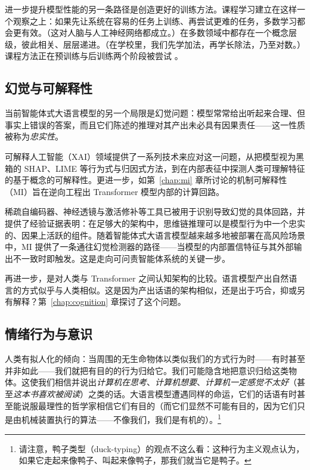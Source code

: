 进一步提升模型性能的另一条路径是创造更好的训练方法。课程学习建立在这样一个观察之上：如果先让系统在容易的任务上训练、再尝试更难的任务，多数学习都会更有效。（这对人脑与人工神经网络都成立。）在多数领域中都存在一个概念层级，彼此相关、层层递进。（在学校里，我们先学加法，再学长除法，乃至对数。）课程方法正在预训练与后训练两个阶段被尝试 \citep{chen2025self,elgaar2026curriculum}。
\subsection{幻觉与可解释性}
当前智能体式大语言模型的另一个局限是幻觉问题：模型常常给出听起来合理、但事实上错误的答案，而且它们陈述的推理对其产出未必具有因果责任——这一性质被称为\emph{忠实性}。

可解释人工智能（XAI）领域提供了一系列技术来应对这一问题，从把模型视为黑箱的 SHAP、LIME 等行为式与归因式方法，到在内部表征中探测人类可理解特征的基于概念的可解释性。更进一步，如第~\ref{chap:mi} 章所讨论的机制可解释性（MI）旨在逆向工程出 Transformer 模型内部的计算回路。

稀疏自编码器、神经透镜与激活修补等工具已被用于识别导致幻觉的具体回路，并提供了经验证据表明：在足够大的架构中，思维链推理可以是模型行为中一个忠实的、因果上活跃的组件。随着智能体式大语言模型越来越多地被部署在高风险场景中，MI 提供了一条通往幻觉检测器的路径——当模型的内部置信特征与其外部输出不一致时即触发。这是走向可问责智能体系统的关键一步。

再进一步，是对人类与 Transformer 之间认知架构的比较。语言模型产出自然语言的方式似乎与人类相似。这是因为产出话语的架构相似，还是出于巧合，抑或另有解释？第~\ref{chap:cognition} 章探讨了这个问题。

\subsection{情绪行为与意识}
人类有拟人化的倾向：当周围的无生命物体以类似我们的方式行为时——有时甚至并非如此——我们就把有目的的行为归给它。我们可能隐含地把意识归给这类物体。这使我们相信并说出{\em 计算机在思考}、{\em 计算机想要}、{\em 计算机一定感觉不太好}（甚至{\em 这本书喜欢被阅读}）之类的话。大语言模型遭遇同样的命运，它们的话语有时甚至能说服最理性的哲学家相信它们有目的（而它们显然不可能有目的，因为它们只是由机械装置执行的算法——不像我们，我们是有机的）。\footnote{请注意，鸭子类型（duck-typing）的观点不这么看：这种行为主义观点认为，如果它走起来像鸭子、叫起来像鸭子，那我们就当它是鸭子。}

